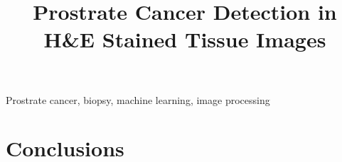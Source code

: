 \documentclass{article}
\title{Prostrate Cancer Detection in H\&E Stained Tissue Images}
\begin{document}
%
\maketitle
%
\begin{abstract}

\end{abstract}
%
\begin{keywords}
Prostrate cancer, biopsy, machine learning, image processing
\end{keywords}
%









\section{Conclusions}
\label{sec:conclusions}



\nocite{*}


\end{document}
